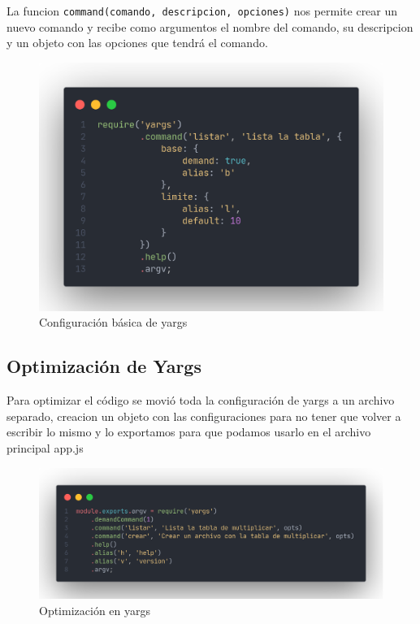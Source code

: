 \documentclass[12pt]{article}
\begin{document}
La funcion \lstinline{command(comando, descripcion, opciones)} nos permite crear un nuevo comando y recibe como argumentos el nombre del comando, su descripcion y un objeto con las opciones que tendrá el comando.

\begin{figure}[H]
    \centering
    \includegraphics[scale=.3]{assets/images/yargs-config.png}
    \caption{Configuración básica de yargs}
\end{figure}

\subsection{Optimización de Yargs}

Para optimizar el código se movió toda la configuración de yargs a un archivo separado, creacion un objeto con las configuraciones para no tener que volver a escribir lo mismo y lo exportamos para que podamos usarlo en el archivo principal app.js

\begin{figure}[H]
    \centering
    \includegraphics[scale=.24]{assets/images/yargs-opt.png}
    \caption{Optimización en yargs}
\end{figure}
\end{document}
